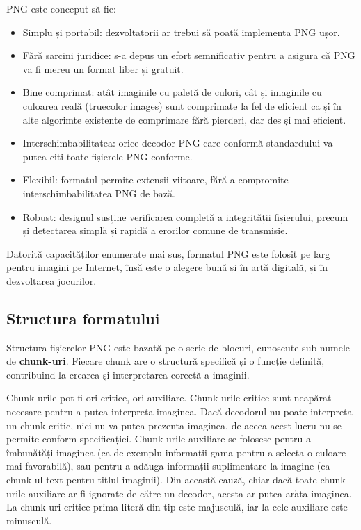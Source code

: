 \documentclass[a4paper,12pt]{report}
\begin{document}
PNG este conceput să fie:

\begin{itemize}
    \item
        Simplu și portabil: dezvoltatorii ar trebui să poată implementa PNG ușor.

    \item
        Fără sarcini juridice: s-a depus un efort semnificativ pentru a asigura
        că PNG va fi mereu un format liber și gratuit.

    \item
        Bine comprimat: atât imaginile cu paletă de culori,
        cât și imaginile cu culoarea reală (truecolor images)
        sunt comprimate la fel de eficient ca și în alte
        algorimte existente de comprimare fără pierderi,
        dar des și mai eficient.

    \item
        Interschimbabilitatea: orice decodor PNG care conformă standardului
        va putea citi toate fișierele PNG conforme.

    \item
        Flexibil: formatul permite extensii viitoare,
        fără a compromite interschimbabilitatea PNG de bază.

    \item
        Robust: designul susține verificarea completă a integrității fișierului,
        precum și detectarea simplă și rapidă a erorilor comune de transmisie.
\end{itemize}

Datorită capacităților enumerate mai sus, formatul \ac{PNG} este folosit
pe larg pentru imagini pe Internet, însă este o alegere bună și în artă digitală,
și în dezvoltarea jocurilor.


\subsection{Structura formatului}

Structura fișierelor \ac{PNG} este bazată pe o serie de blocuri,
cunoscute sub numele de \textbf{chunk-uri}.
Fiecare chunk are o structură specifică și o funcție definită,
contribuind la crearea și interpretarea corectă a imaginii.

Chunk-urile pot fi ori critice, ori auxiliare.
Chunk-urile critice sunt neapărat necesare pentru a putea interpreta imaginea.
Dacă decodorul nu poate interpreta un chunk critic, nici nu va putea prezenta imaginea,
de aceea acest lucru nu se permite conform specificației.
Chunk-urile auxiliare se folosesc pentru a îmbunătăți imaginea 
(ca de exemplu informații gama pentru a selecta o culoare mai favorabilă),
sau pentru a adăuga informații suplimentare la imagine
(ca chunk-ul text pentru titlul imaginii).
Din această cauză, chiar dacă toate chunk-urile auxiliare ar fi ignorate de către un decodor,
acesta ar putea arăta imaginea.
La chunk-uri critice prima literă din tip este majusculă,
iar la cele auxiliare este minusculă.
\end{document}
